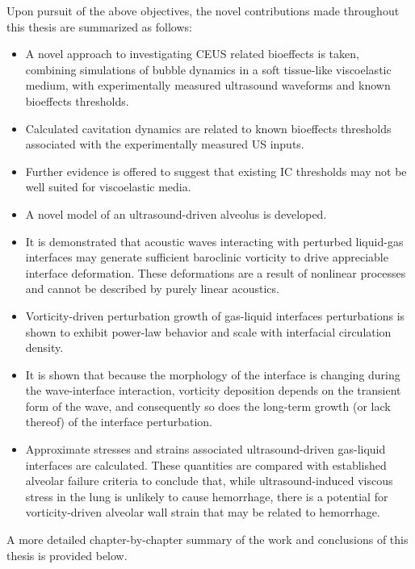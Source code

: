 Upon pursuit of the above objectives, the novel contributions made
throughout this thesis are summarized as follows:
\begin{itemize}
\item A novel approach to investigating \ac{CEUS} related bioeffects
  is taken, combining simulations of bubble dynamics in a soft
  tissue-like viscoelastic medium, with experimentally measured
  ultrasound waveforms and known bioeffects thresholds.
\item Calculated cavitation dynamics are related to known bioeffects
  thresholds associated with the experimentally measured \ac{US}
  inputs.
\item Further evidence is offered to suggest that existing \ac{IC}
  thresholds may not be well suited for viscoelastic media.
\item A novel model of an ultrasound-driven alveolus is developed.
\item It is demonstrated that acoustic waves interacting with
  perturbed liquid-gas interfaces may generate sufficient baroclinic
  vorticity to drive appreciable interface deformation. These
  deformations are a result of nonlinear processes and cannot be
  described by purely linear acoustics.
\item Vorticity-driven perturbation growth of gas-liquid interfaces
  perturbations is shown to exhibit power-law behavior and scale with
  interfacial circulation density.
\item It is shown that because the morphology of the interface is
  changing during the wave-interface interaction, vorticity deposition
  depends on the transient form of the wave, and consequently so does
  the long-term growth (or lack thereof) of the interface perturbation.
\item Approximate stresses and strains associated ultrasound-driven
  gas-liquid interfaces are calculated. These quantities are compared
  with established alveolar failure criteria to conclude that, while
  ultrasound-induced viscous stress in the lung is unlikely to cause
  hemorrhage, there is a potential for vorticity-driven alveolar wall
  strain that may be related to hemorrhage.
\end{itemize}
A more detailed chapter-by-chapter summary of the work and conclusions
of this thesis is provided below.

